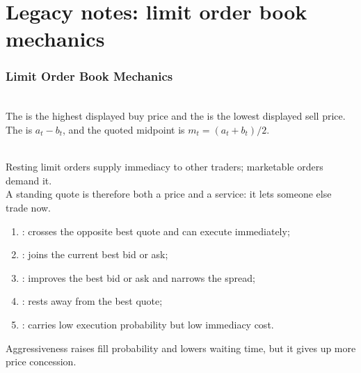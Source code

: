 \documentclass[a4paper,oneside,openany]{book}
\begin{document}
\chapter*{Legacy notes: limit order book mechanics}

\subsection*{Limit Order Book Mechanics}

\begin{definition} \\
The  is the highest displayed buy price and the  is the lowest displayed sell price. The  is $a_t-b_t$, and the quoted midpoint is $m_t=(a_t+b_t)/2$.
\end{definition}

\begin{principle} \\
Resting limit orders supply immediacy to other traders; marketable orders demand it.\\
A standing quote is therefore both a price and a service: it lets someone else trade now.
\end{principle}

\begin{taxonomy} 
\begin{enumerate}[label=\roman*.]
\setlength{\itemsep}{0pt}
\item {}: crosses the opposite best quote and can execute immediately;
\item {}: joins the current best bid or ask;
\item {}: improves the best bid or ask and narrows the spread;
\item {}: rests away from the best quote;
\item {}: carries low execution probability but low immediacy cost.
\end{enumerate}
Aggressiveness raises fill probability and lowers waiting time, but it gives up more price concession.
\end{taxonomy}
\end{document}
